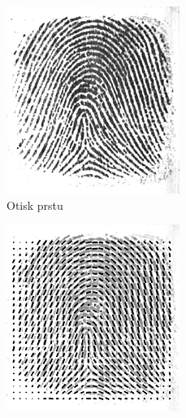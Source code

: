 \begin{figure}[h]\centering
    \centering
    \begin{subfigure}{0.3\textwidth}
    \includegraphics[width=0.9\linewidth]{obrazky-figures/fingerprint1.png}\hfill
    \caption{Otisk prstu}
    \label{ds_a}
    \end{subfigure}
    \begin{subfigure}{0.3\textwidth}
    \includegraphics[width=0.9\linewidth]{obrazky-figures/fingerprint2.png}\hfill

\end{subfigure}
\end{figure}
